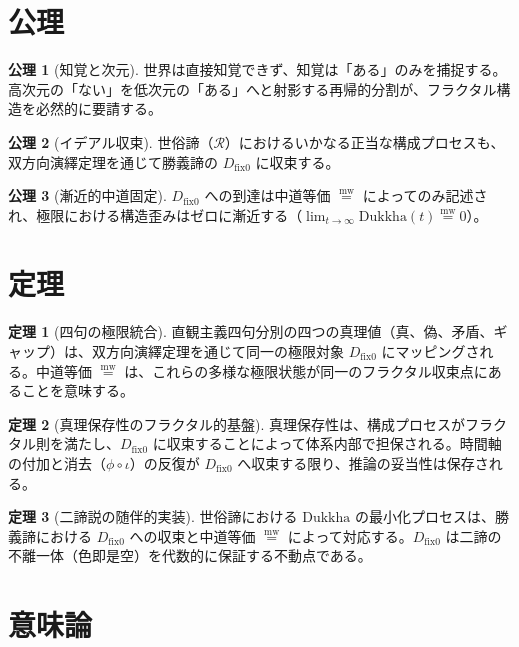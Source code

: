 \documentclass[11pt,a4paper]{article}
\newcommand{\mweq}{\mathrel{\overset{\mathrm{mw}}{=}}}
\newcommand{\dfix}{D_{\mathrm{fix}0}}
\newcommand{\Dukkha}{\mathrm{Dukkha}}
\newcommand{\Rep}{\mathcal{R}}
\theoremstyle{definition}
\newtheorem{axiom}{公理}[section]
\newtheorem{theorem}{定理}[section]
\begin{document}
\section{公理}

\begin{axiom}[知覚と次元]
世界は直接知覚できず、知覚は「ある」のみを捕捉する。高次元の「ない」を低次元の「ある」へと射影する再帰的分割が、フラクタル構造を必然的に要請する。
\end{axiom}

\begin{axiom}[イデアル収束]
世俗諦（$\Rep$）におけるいかなる正当な構成プロセスも、双方向演繹定理を通じて勝義諦の $\dfix$ に収束する。
\end{axiom}

\begin{axiom}[漸近的中道固定]
$\dfix$ への到達は中道等価 $\mweq$ によってのみ記述され、極限における構造歪みはゼロに漸近する（$\lim_{t \to \infty} \Dukkha(t) \mweq 0$）。
\end{axiom}

\section{定理}

\begin{theorem}[四句の極限統合]
直観主義四句分別の四つの真理値（真、偽、矛盾、ギャップ）は、双方向演繹定理を通じて同一の極限対象 $\dfix$ にマッピングされる。中道等価 $\mweq$ は、これらの多様な極限状態が同一のフラクタル収束点にあることを意味する。
\end{theorem}

\begin{theorem}[真理保存性のフラクタル的基盤]
真理保存性は、構成プロセスがフラクタル則を満たし、$\dfix$ に収束することによって体系内部で担保される。時間軸の付加と消去（$\phi \circ \iota$）の反復が $\dfix$ へ収束する限り、推論の妥当性は保存される。
\end{theorem}

\begin{theorem}[二諦説の随伴的実装]
世俗諦における $\Dukkha$ の最小化プロセスは、勝義諦における $\dfix$ への収束と中道等価 $\mweq$ によって対応する。$\dfix$ は二諦の不離一体（色即是空）を代数的に保証する不動点である。
\end{theorem}

\section{意味論}
\end{document}
